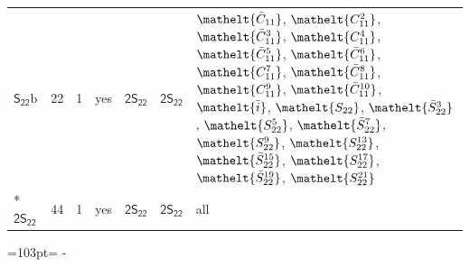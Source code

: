 \documentclass[10pt,a4paper]{article}
\newcommand{\needspace}[1]{\par\penalty-100\begingroup\dimen0=#1\relax\dimen2=\pagegoal
  \advance\dimen2-\pagetotal\ifdim\dimen0>\dimen2\relax\ifdim\dimen2>0pt\vfil\break\fi\fi
  \endgroup}
\numberwithin{equation}{section}
\newcommand{\eltfont}[1]{{\let\sigma\eltsigma\mathelt{#1}}}
\newcommand{\grp}[1]{\mathsf{#1}}
\newcommand{\cls}[1]{\eltfont{#1}}
\newcommand{\barred}[1]{\bar{#1}}
\newcommand{\secondclass}{\mathrm{b}}
\newlength{\fillwidth}\newlength{\cellwidth}\newlength{\colwidth}
\begin{document}
{\begin{longtable}{@{}lrrlll>{\RaggedRight\arraybackslash}p{\fillwidth}@{}}
\href{S22b.pdf}{$\grp{S_{22}}\secondclass$} & 22 & 1 & yes & \href{2S22.pdf}{$\grp{2S_{22}}$} & \href{2S22.pdf}{$\grp{2S_{22}}$} & $\cls{\barred{C}_{11}}$, $\cls{C_{11}^{2}}$, $\cls{\barred{C}_{11}^{3}}$, $\cls{C_{11}^{4}}$, $\cls{\barred{C}_{11}^{5}}$, $\cls{\barred{C}_{11}^{6}}$, $\cls{C_{11}^{7}}$, $\cls{\barred{C}_{11}^{8}}$, $\cls{C_{11}^{9}}$, $\cls{\barred{C}_{11}^{10}}$, $\cls{\barred{i}}$, $\cls{S_{22}}$, $\cls{\barred{S}_{22}^{3}}$, $\cls{S_{22}^{5}}$, $\cls{\barred{S}_{22}^{7}}$, $\cls{S_{22}^{9}}$, $\cls{S_{22}^{13}}$, $\cls{\barred{S}_{22}^{15}}$, $\cls{S_{22}^{17}}$, $\cls{\barred{S}_{22}^{19}}$, $\cls{S_{22}^{21}}$\\*
\href{2S22.pdf}{$\grp{2S_{22}}$} & 44 & 1 & yes & \href{2S22.pdf}{$\grp{2S_{22}}$} & \href{2S22.pdf}{$\grp{2S_{22}}$} & all\\
\bottomrule\end{longtable}}
\needspace{103pt}
\end{document}
